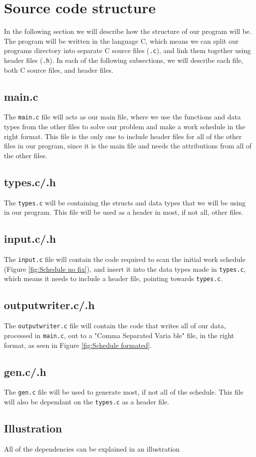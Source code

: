 \section{Source code structure}
In the following section we will describe how the structure of our program will be. The program will be written in the language C, which means we can split our programs directory into separate C source files (\verb|.c|), and link them together using header files (\verb|.h|). In each of the following subsections, we will describe each file, both C source files, and header files.

\subsection{main.c}
The \verb|main.c| file will acts as our main file, where we use the functions and data types from the other files to solve our problem and make a work schedule in the right format. This file is the only one to include header files for all of the other files in our program, since it is the main file and needs the attributions from all of the other files.

\subsection{types.c/.h}
The \verb|types.c| will be containing the structs and data types that we will be using in our program. This file will be used as a header in most, if not all, other files.

\subsection{input.c/.h}
The \verb|input.c| file will contain the code required to scan the initial work schedule (Figure \ref{fig:Schedule no fix}), and insert it into the data types made in \verb|types.c|, which means it needs to include a header file, pointing towards \verb|types.c|.

\subsection{outputwriter.c/.h}
The \verb|outputwriter.c| file will contain the code that writes all of our data, processed in \verb|main.c|, out to a "Comma Separated Varia
ble" file, in the right format, as seen in Figure \ref{fig:Schedule formated}.

\subsection{gen.c/.h}
The \verb|gen.c| file will be used to generate most, if not all of the schedule. This file will also be dependant on the \verb|types.c| as a header file.

\subsection{Illustration}
All of the dependencies can be explained in an illustration

